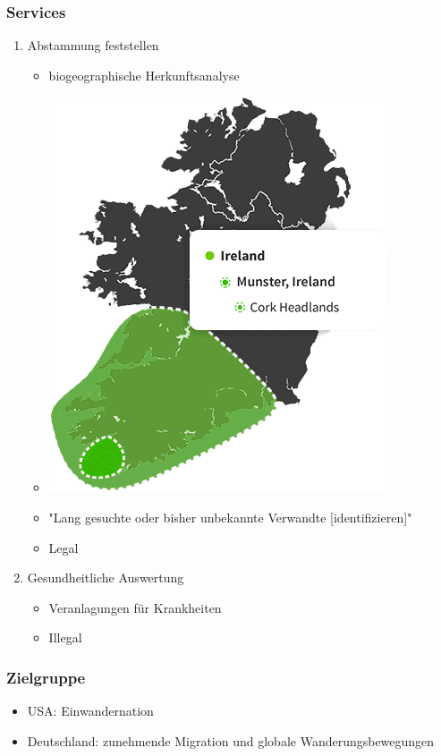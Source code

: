 \documentclass{beamer}
\begin{document}
\begin{frame}[allowframebreaks]
  \frametitle{Services}

  \begin{enumerate}
    \item Abstammung feststellen
      \begin{itemize}
        \item biogeographische Herkunftsanalyse
        \item \includegraphics[scale=0.2]{dna-regions}
        \item "Lang gesuchte oder bisher unbekannte Verwandte [identifizieren]"\autocite{ancestryBlog}
        \item Legal\autocite{genDG2}
      \end{itemize}
    \break
    \item Gesundheitliche Auswertung
      \begin{itemize}
        \item Veranlagungen für Krankheiten
        \item Illegal\autocite{genDG7}
      \end{itemize}
  \end{enumerate}
\end{frame}

\begin{frame}
  \frametitle{Zielgruppe}

  \begin{itemize}
    \item USA: Einwandernation
    \item Deutschland: zunehmende Migration und globale Wanderungsbewegungen
  \end{itemize}
\end{frame}
\end{document}
